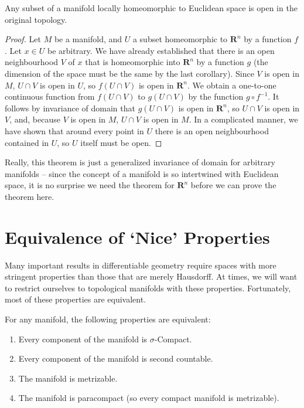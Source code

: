 \begin{theorem}
    Any subset of a manifold locally homeomorphic to Euclidean space is open in the original topology.
\end{theorem}
\begin{proof}
    Let $M$ be a manifold, and $U$ a subset homeomorphic to $\mathbf{R}^n$ by a function $f$. Let $x \in U$ be arbitrary. We have already established that there is an open neighbourhood $V$ of $x$ that is homeomorphic into $\mathbf{R}^n$ by a function $g$ (the dimension of the space must be the same by the last corollary). Since $V$ is open in $M$, $U \cap V$ is open in $U$, so $f(U \cap V)$ is open in $\mathbf{R}^n$. We obtain a one-to-one continuous function from $f(U \cap V)$ to $g(U \cap V)$ by the function $g \circ f^{-1}$. It follows by invariance of domain that $g(U \cap V)$ is open in $\mathbf{R}^n$, so $U \cap V$ is open in $V$, and, because $V$ is open in $M$, $U \cap V$ is open in $M$. In a complicated manner, we have shown that around every point in $U$ there is an open neighbourhood contained in $U$, so $U$ itself must be open.
\end{proof}

Really, this theorem is just a generalized invariance of domain for arbitrary manifolds -- since the concept of a manifold is so intertwined with Euclidean space, it is no surprise we need the theorem for $\mathbf{R}^n$ before we can prove the theorem here.

\section{Equivalence of `Nice' Properties}

Many important results in differentiable geometry require spaces with more stringent properties than those that are merely Hausdorff. At times, we will want to restrict ourselves to topological manifolds with these properties. Fortunately, most of these properties are equivalent.

\begin{theorem}
    For any manifold, the following properties are equivalent:
    \begin{enumerate}
        \item Every component of the manifold is $\sigma$-Compact.
        \item Every component of the manifold is second countable.
        \item The manifold is metrizable.
        \item The manifold is paracompact (so every compact manifold is metrizable).
    \end{enumerate}
\end{theorem}

